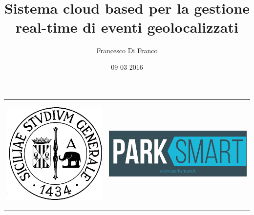 \documentclass{beamer}
\title[Relazione progetto finale]{Sistema cloud based per la gestione real-time di eventi geolocalizzati}
\author{Francesco Di Franco} %
\institute[UniCT] 
{
Univerist\`a degli studi di Catania \\ %
\medskip
\textit{} 
}
\date{09-03-2016}
\begin{document}
\begin{frame}


\begin{table}[]
\centering
\begin{tabular}{ll}

\begin{minipage}{0.4\textwidth}
\begin{center}
\includegraphics[scale=0.15]{../img/logo_unict.png}
\end{center}
\end{minipage}

&  
\begin{minipage}{0.5\textwidth}

\includegraphics[scale=0.07]{../img/logoPSM.png}

\end{minipage}

\end{tabular}
\end{table}
\titlepage
\end{frame}
\end{document}
